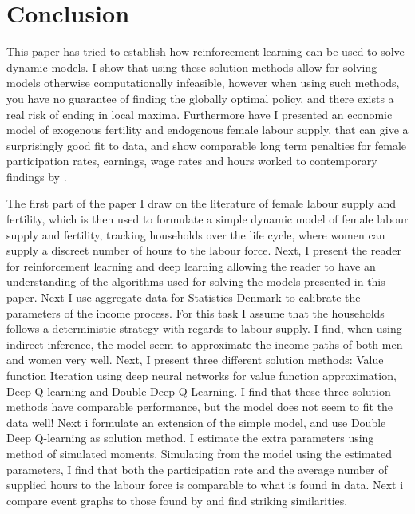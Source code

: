 \section{Conclusion}

This paper has tried to establish how reinforcement learning can be used to solve dynamic models. I show that using these solution methods allow for solving models otherwise computationally infeasible, however when using such methods, you have no guarantee of finding the globally optimal policy, and there exists a real risk of ending in local maxima. Furthermore have I presented an economic model of exogenous fertility and endogenous female labour supply, that can give a surprisingly good fit to data, and show comparable long term penalties for female participation rates, earnings, wage rates and hours worked to contemporary findings by \textcite{kleven_children_2019}. 

The first part of the paper I draw on the literature of female labour supply and fertility, which is then used to formulate a simple dynamic model of female labour supply and fertility, tracking households over the life cycle, where women can supply a discreet number of hours to the labour force. Next, I present the reader for reinforcement learning and deep learning allowing the reader to have an understanding of the algorithms used for solving the models presented in this paper. Next I use aggregate data for Statistics Denmark to calibrate the parameters of the income process. For this task I assume that the households follows a deterministic strategy with regards to labour supply. I find, when using indirect inference, the model seem to approximate the income paths of both men and women very well. Next, I present three different solution methods: Value function Iteration using deep neural networks for value function approximation, Deep Q-learning and Double Deep Q-Learning. I find that these three solution methods have comparable performance, but the model does not seem to fit the data well! Next i formulate an extension of the simple model, and use Double Deep Q-learning as solution method. I estimate the extra parameters using method of simulated moments. Simulating from the model using the estimated parameters, I find that both the participation rate and the average number of supplied hours to the labour force is comparable to what is found in data. Next i compare event graphs to those found by \textcite{kleven_children_2019} and find striking similarities.